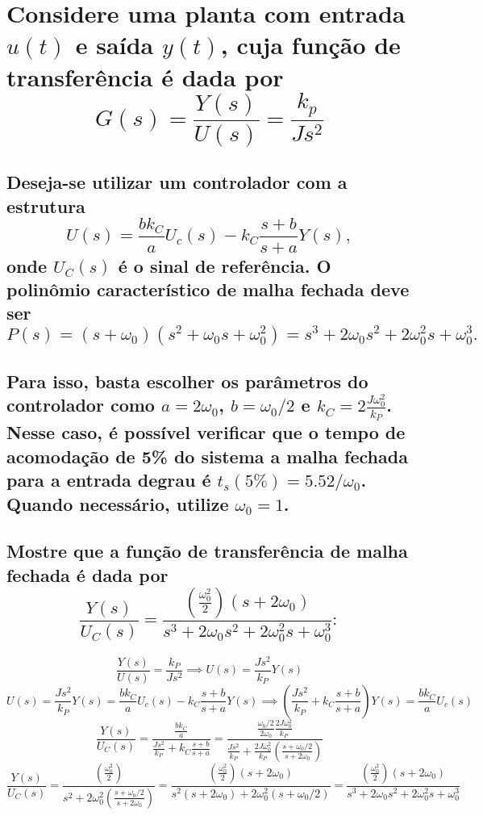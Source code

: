 \documentclass{article}
\begin{document}
\section{Considere uma planta com entrada $u(t)$ e saída $y(t)$, cuja função de transferência é dada por $$ G(s) = \frac{Y(s)}{U(s)} = \frac{k_p}{Js^2} $$}
\subsection*{Deseja-se utilizar um controlador com a estrutura $$ U(s) = \frac{bk_C}{a}U_c(s) - k_C\frac{s+b}{s+a}Y(s), $$ onde $U_C(s)$ é o sinal de referência. O polinômio característico de malha fechada deve ser $$ P(s) = (s+\omega_0)(s^2 + \omega_0s + \omega_0^2) = s^3 + 2\omega_0s^2 + 2\omega_0^2s + \omega_0^3. $$}
\subsection*{Para isso, basta escolher os parâmetros do controlador como $a = 2\omega_0$, $b = \omega_0/2$ e $k_C = 2\frac{J\omega_0^2}{k_P}$. Nesse caso, é possível verificar que o tempo de acomodação de 5\% do sistema a malha fechada para a entrada degrau é $t_s(5\%) = 5.52/\omega_0$. Quando necessário, utilize $\omega_0 = 1$.}

\subsection{Mostre que a função de transferência de malha fechada é dada por $$ \frac{Y(s)}{U_C(s)} = \frac{ (\frac{\omega_0^2}{2})\left( s + 2\omega_0\right) }{ s^3 + 2\omega_0s^2 + 2\omega_0^2s + \omega_0^3 }: $$}

    \[ \frac{Y(s)}{U(s)} = \frac{k_P}{Js^2} \implies U(s) = \frac{Js^2}{k_P}Y(s) \]
    \[ U(s) = \frac{Js^2}{k_P}Y(s) = \frac{bk_C}{a}U_c(s) - k_C\frac{s+b}{s+a}Y(s) \implies \left( \frac{Js^2}{k_P} + k_C\frac{s+b}{s+a} \right)Y(s) = \frac{bk_C}{a}U_c(s) \]
    \[ \frac{Y(s)}{U_C(s)} = \frac{\frac{bk_C}{a}}{\frac{Js^2}{k_P} + k_C\frac{s+b}{s+a}} = \frac{ \frac{\omega_0/2}{2\omega_0} \frac{2J\omega_0^2}{k_P} }{ \frac{Js^2}{k_P} + \frac{2J\omega_0^2}{k_P} \left( \frac{s + \omega_0/2}{s + 2\omega_0} \right) } \]
    \[ \frac{Y(s)}{U_C(s)} = \frac{\left( \frac{\omega_0^2}{2} \right)}{s^2 + 2\omega_0^2\left( \frac{s+\omega_0/2}{s+2\omega_0} \right)} = \frac{\left( \frac{\omega_0^2}{2} \right)(s+2\omega_0)}{s^2(s+2\omega_0) + 2\omega_0^2( s+\omega_0/2 )} = \frac{ (\frac{\omega_0^2}{2})\left( s + 2\omega_0\right) }{ s^3 + 2\omega_0s^2 + 2\omega_0^2s + \omega_0^3 } \]
\end{document}
